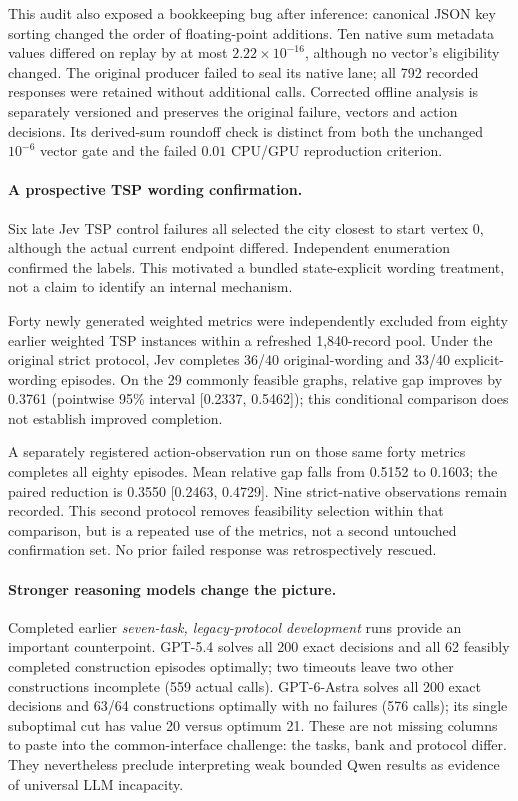This audit also exposed a bookkeeping bug after inference: canonical JSON
key sorting changed the order of floating-point additions. Ten native
sum metadata values differed on replay by at most $2.22\times10^{-16}$,
although no vector's eligibility changed. The original producer failed to
seal its native lane; all 792 recorded responses were retained without
additional calls. Corrected offline analysis is separately versioned and
preserves the original failure, vectors and action decisions.
Its derived-sum roundoff check is distinct from both the unchanged $10^{-6}$
vector gate and the failed $0.01$ CPU/GPU reproduction criterion.

\paragraph{A prospective TSP wording confirmation.}
Six late Jev TSP control failures all selected the city closest to start
vertex 0, although the actual current endpoint differed. Independent
enumeration confirmed the labels. This motivated a bundled state-explicit
wording treatment, not a claim to identify an internal mechanism.

Forty newly generated weighted metrics were independently excluded from
eighty earlier weighted TSP instances within a refreshed 1,840-record pool.
Under the original strict protocol, Jev completes 36/40 original-wording
and 33/40 explicit-wording episodes. On the 29 commonly feasible graphs,
relative gap improves by 0.3761 (pointwise 95\% interval [0.2337, 0.5462]);
this conditional comparison does not establish improved completion.

A separately registered action-observation run on those same forty metrics
completes all eighty episodes. Mean relative gap falls from 0.5152 to 0.1603;
the paired reduction is 0.3550 [0.2463, 0.4729]. Nine strict-native observations
remain recorded. This second protocol removes feasibility selection within
that comparison, but is a repeated use of the metrics, not a second untouched
confirmation set. No prior failed response was retrospectively rescued.

\paragraph{Stronger reasoning models change the picture.}
Completed earlier \emph{seven-task, legacy-protocol development} runs provide
an important counterpoint. GPT-5.4 solves all 200 exact decisions and all 62
feasibly completed construction episodes optimally; two timeouts leave
two other constructions incomplete (559 actual calls). GPT-6-Astra solves
all 200 exact decisions and 63/64 constructions optimally with no failures
(576 calls); its single suboptimal cut has value 20 versus optimum 21.
These are not missing columns to paste into the common-interface challenge:
the tasks, bank and protocol differ. They nevertheless preclude interpreting
weak bounded Qwen results as evidence of universal LLM incapacity.

